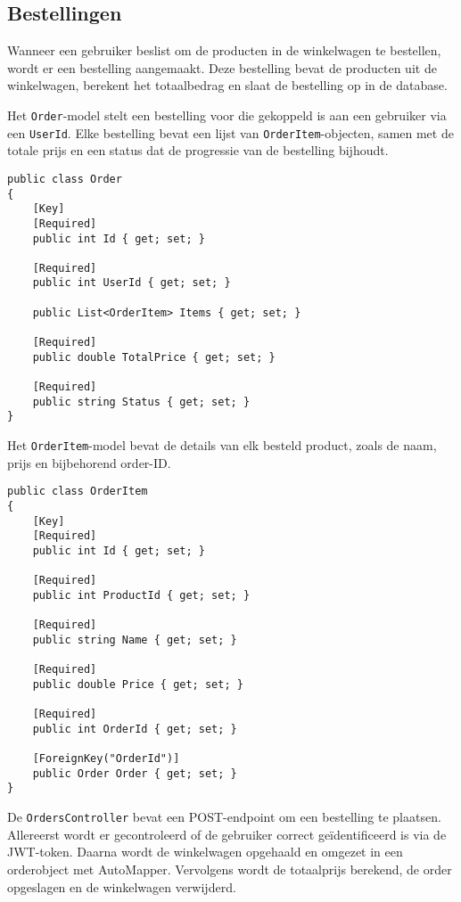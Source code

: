 \subsection{Bestellingen}

Wanneer een gebruiker beslist om de producten in de winkelwagen te bestellen, wordt er een bestelling aangemaakt. Deze bestelling bevat de producten uit de winkelwagen, berekent het totaalbedrag en slaat de bestelling op in de database.

\medskip
Het \texttt{Order}-model stelt een bestelling voor die gekoppeld is aan een gebruiker via een \texttt{UserId}. Elke bestelling bevat een lijst van \texttt{OrderItem}-objecten, samen met de totale prijs en een status dat de progressie van de bestelling bijhoudt.
\medskip

\begin{lstlisting}[style=mystyleA, caption=Order.cs, label=lst:MonoOrderModel]
public class Order
{
	[Key]
	[Required]
	public int Id { get; set; }
	
	[Required]
	public int UserId { get; set; }
	
	public List<OrderItem> Items { get; set; }
	
	[Required]
	public double TotalPrice { get; set; }
	
	[Required]
	public string Status { get; set; }
}
\end{lstlisting}

\medskip
Het \texttt{OrderItem}-model bevat de details van elk besteld product, zoals de naam, prijs en bijbehorend order-ID.
\medskip

\begin{lstlisting}[style=mystyleA, caption=OrderItem.cs, label=lst:MonoOrderItemModel]
public class OrderItem
{
	[Key]
	[Required]
	public int Id { get; set; }
	
	[Required]
	public int ProductId { get; set; }
	
	[Required]
	public string Name { get; set; }
	
	[Required]
	public double Price { get; set; }
	
	[Required]
	public int OrderId { get; set; }
	
	[ForeignKey("OrderId")]
	public Order Order { get; set; }
}
\end{lstlisting}

\medskip
De \texttt{OrdersController} bevat een POST-endpoint om een bestelling te plaatsen. Allereerst wordt er gecontroleerd of de gebruiker correct geïdentificeerd is via de JWT-token. Daarna wordt de winkelwagen opgehaald en omgezet in een orderobject met AutoMapper. Vervolgens wordt de totaalprijs berekend, de order opgeslagen en de winkelwagen verwijderd.
\medskip

